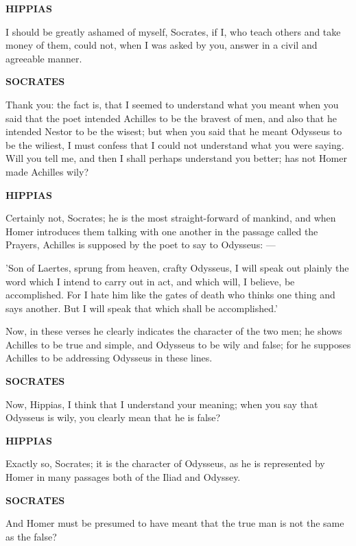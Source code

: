 \documentclass[11pt,letter]{article}
\begin{document}
\par \textbf{HIPPIAS}
\par   I should be greatly ashamed of myself, Socrates, if I, who teach others and take money of them, could not, when I was asked by you, answer in a civil and agreeable manner.

\par \textbf{SOCRATES}
\par   Thank you:  the fact is, that I seemed to understand what you meant when you said that the poet intended Achilles to be the bravest of men, and also that he intended Nestor to be the wisest; but when you said that he meant Odysseus to be the wiliest, I must confess that I could not understand what you were saying. Will you tell me, and then I shall perhaps understand you better; has not Homer made Achilles wily?

\par \textbf{HIPPIAS}
\par   Certainly not, Socrates; he is the most straight-forward of mankind, and when Homer introduces them talking with one another in the passage called the Prayers, Achilles is supposed by the poet to say to Odysseus: —

\par  'Son of Laertes, sprung from heaven, crafty Odysseus, I will speak out plainly the word which I intend to carry out in act, and which will, I believe, be accomplished. For I hate him like the gates of death who thinks one thing and says another. But I will speak that which shall be accomplished.'

\par  Now, in these verses he clearly indicates the character of the two men; he shows Achilles to be true and simple, and Odysseus to be wily and false; for he supposes Achilles to be addressing Odysseus in these lines.

\par \textbf{SOCRATES}
\par   Now, Hippias, I think that I understand your meaning; when you say that Odysseus is wily, you clearly mean that he is false?

\par \textbf{HIPPIAS}
\par   Exactly so, Socrates; it is the character of Odysseus, as he is represented by Homer in many passages both of the Iliad and Odyssey.

\par \textbf{SOCRATES}
\par   And Homer must be presumed to have meant that the true man is not the same as the false?
\end{document}
